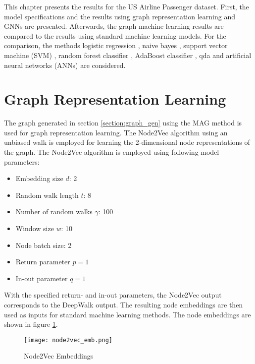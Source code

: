   
  This chapter presents the results for the US Airline Passenger dataset. First, 
  the model specifications and the results using graph representation learning 
  and GNNs are presented. Afterwards, the graph machine learning results are 
  compared to the results using standard machine learning models. For the 
  comparison, the methods logistic regression \citep{cramer2002origins}, naive 
  bayes \citep{zhang2004bayes}, support vector machine (SVM) 
  \citep{platt1999probabilistic,chang2011libsvm}, random forest classifier 
  \citep{breiman2001random}, AdaBoost classifier 
  \citep{freund1997decision,hastie2009multi}, \ac{qda} \citep{tharwat2016linear} 
  and artificial neural networks (ANNs) \citep{mcculloch1943logical} are considered.

  \section{Graph Representation Learning}
  \label{section:result_n2v}

  The graph generated in section \ref{section:graph_gen} using the MAG method
  is used for graph representation learning. The Node2Vec algorithm using an
  unbiased walk is employed for learning the 2-dimensional node representations 
  of the graph. The Node2Vec algorithm is employed using following model 
  parameters:

  \begin{itemize}
    \setlength\itemsep{0.1em}
    \item Embedding size $d$: 2
    \item Random walk length $t$: 8
    \item Number of random walks $\gamma$: 100
    \item Window size $w$: 10
    \item Node batch size: 2
    \item Return parameter $p=1$
    \item In-out parameter $q=1$
  \end{itemize}

  \noindent With the specified return- and in-out parameters, the Node2Vec
  output corresponds to the DeepWalk output. The resulting node embeddings are
  then used as inputs for standard machine learning methods. The node embeddings 
  are shown in figure \ref{fig:node2vec}. 

  \begin{figure}[h]
		\centering
		\texttt{[image: node2vec\_emb.png]}
		\caption{Node2Vec Embeddings}
        \label{fig:node2vec}
  \end{figure}

